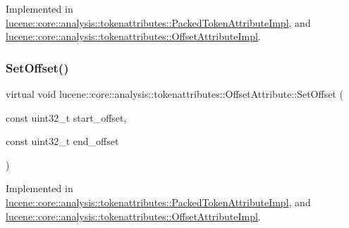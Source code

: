 Implemented in \mbox{\hyperlink{classlucene_1_1core_1_1analysis_1_1tokenattributes_1_1PackedTokenAttributeImpl_ae6210d544884be562c186a040d91157f}{lucene\+::core\+::analysis\+::tokenattributes\+::\+Packed\+Token\+Attribute\+Impl}}, and \mbox{\hyperlink{classlucene_1_1core_1_1analysis_1_1tokenattributes_1_1OffsetAttributeImpl_a1e70ec558f605ea2313e41ba5c64e379}{lucene\+::core\+::analysis\+::tokenattributes\+::\+Offset\+Attribute\+Impl}}.

\mbox{\label{classlucene_1_1core_1_1analysis_1_1tokenattributes_1_1OffsetAttribute_aa0d076ac2e7c5af86668fbbeb8e26170}} 
\subsubsection{\texorpdfstring{Set\+Offset()}{SetOffset()}}
{\footnotesize\ttfamily virtual void lucene\+::core\+::analysis\+::tokenattributes\+::\+Offset\+Attribute\+::\+Set\+Offset (\begin{DoxyParamCaption}\item[{const uint32\+\_\+t}]{start\+\_\+offset,  }\item[{const uint32\+\_\+t}]{end\+\_\+offset }\end{DoxyParamCaption})\hspace{0.3cm}{\ttfamily [pure virtual]}}



Implemented in \mbox{\hyperlink{classlucene_1_1core_1_1analysis_1_1tokenattributes_1_1PackedTokenAttributeImpl_aa17ed401f2b9f6bd773291de1d02bb35}{lucene\+::core\+::analysis\+::tokenattributes\+::\+Packed\+Token\+Attribute\+Impl}}, and \mbox{\hyperlink{classlucene_1_1core_1_1analysis_1_1tokenattributes_1_1OffsetAttributeImpl_ab554b85bf6d64ce023c0634b3883c803}{lucene\+::core\+::analysis\+::tokenattributes\+::\+Offset\+Attribute\+Impl}}.

\mbox{\label{classlucene_1_1core_1_1analysis_1_1tokenattributes_1_1OffsetAttribute_af841d190a7900a5b6a00f0a9f4ae7e43}} 
